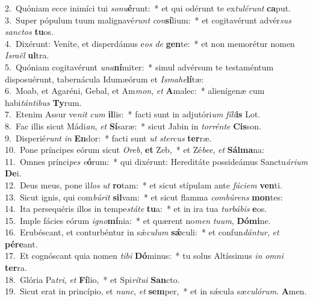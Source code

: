 {2.~}Quóniam ecce inimíci tui \textit{so}\textit{nu}\textbf{é}runt:~* et qui odérunt te ex\textit{tu}\textit{lé}\textit{runt} \textbf{ca}put.\\
{3.~}Super pópulum tuum malignavé\textit{runt} \textit{con}\textbf{sí}lium:~* et cogitavérunt advér\textit{sus} \textit{san}\textit{ctos} \textbf{tu}os.\\
{4.~}Dixérunt: Veníte, et disperdámus e\textit{os} \textit{de} \textbf{gen}te:~* et non memorétur nomen \textit{Is}\textit{ra}\textit{ël} \textbf{ul}tra.\\
{5.~}Quóniam cogitavérunt \textit{u}\textit{na}\textbf{ní}miter:~* simul advérsum te testaméntum disposuérunt, tabernácula Idumæórum et \textit{Is}\textit{ma}\textit{he}\textbf{lí}tæ:\\
{6.~}Moab, et Agaréni, Gebal, et Am\textit{mon}, \textit{et} \textbf{A}malec:~* alienígenæ cum habi\textit{tán}\textit{ti}\textit{bus} \textbf{Ty}rum.\\
{7.~}Etenim Assur ve\textit{nit} \textit{cum} \textbf{il}lis:~* facti sunt in adjutóri\textit{um} \textit{fí}\textit{li}\textbf{is} Lot.\\
{8.~}Fac illis sicut Mádi\textit{an}, \textit{et} \textbf{Sí}saræ:~* sicut Jabin in \textit{tor}\textit{rén}\textit{te} \textbf{Cis}son.\\
{9.~}Disperié\textit{runt} \textit{in} \textbf{En}dor:~* facti sunt \textit{ut} \textit{ster}\textit{cus} \textbf{ter}ræ.\\
{10.~}Pone príncipes eórum sicut \textit{O}\textit{reb}, \textbf{et} Zeb,~* et Zé\textit{be}\textit{e}, \textit{et} \textbf{Sál}\textbf{ma}na:\\
{11.~}Omnes prínci\textit{pes} \textit{e}\textbf{ó}rum:~* qui dixérunt: Hereditáte possideámus Sanctu\textit{á}\textit{ri}\textit{um} \textbf{De}i.\\
{12.~}Deus meus, pone il\textit{los} \textit{ut} \textbf{ro}tam:~* et sicut stípulam ante \textit{fá}\textit{ci}\textit{em} \textbf{ven}ti.\\
{13.~}Sicut ignis, qui com\textit{bú}\textit{rit} \textbf{sil}vam:~* et sicut flamma \textit{com}\textit{bú}\textit{rens} \textbf{mon}tes:\\
{14.~}Ita persequéris illos in tempe\textit{stá}\textit{te} \textbf{tu}a:~* et in ira tua \textit{tur}\textit{bá}\textit{bis} \textbf{e}os.\\
{15.~}Imple fácies eórum \textit{i}\textit{gno}\textbf{mí}nia:~* et quærent no\textit{men} \textit{tu}\textit{um}, \textbf{Dó}\textbf{mi}ne.\\
{16.~}Erubéscant, et conturbéntur in sǽ\textit{cu}\textit{lum} \textbf{sǽ}culi:~* et confun\textit{dán}\textit{tur}, \textit{et} \textbf{pé}\textbf{re}ant.\\
{17.~}Et cognóscant quia nomen \textit{ti}\textit{bi} \textbf{Dó}minus:~* tu solus Altíssimus \textit{in} \textit{om}\textit{ni} \textbf{ter}ra.\\
{18.~}Glória Pa\textit{tri}, \textit{et} \textbf{Fí}lio,~* et Spi\textit{rí}\textit{tu}\textit{i} \textbf{San}cto.\\
{19.~}Sicut erat in princípio, et \textit{nunc}, \textit{et} \textbf{sem}per,~* et in sǽcula sæ\textit{cu}\textit{ló}\textit{rum}. \textbf{A}men.\\
